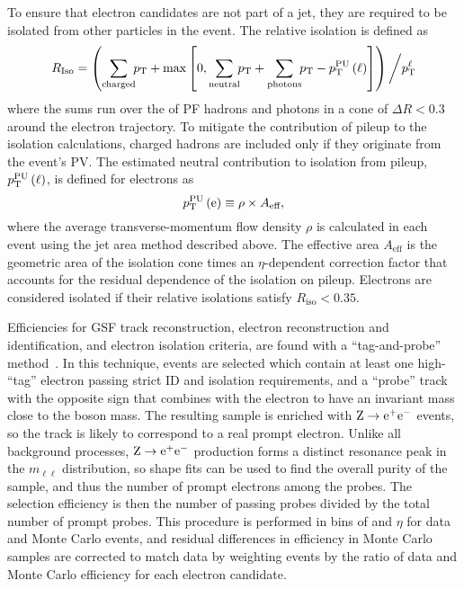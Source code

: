 To ensure that electron candidates are not part of a jet, they are required to be isolated from other particles in the event.
The relative isolation is defined as
\begin{equation}\label{eq:iso}
  R_\text{Iso} = \left( \sum_\text{charged} \! \!p_\mathrm{T} + \max\left[0, \sum_\text{neutral} \! \!p_\mathrm{T} + \sum_{\text{photons}} \! \!p_\mathrm{T} - p_\mathrm{T}^\text{PU} \left(\ell\right) \right]\right) \bigg/ p_\mathrm{T}^{\ell}
\end{equation}
where the sums run over the {\pt} of PF hadrons and photons in a cone of $\Delta R < 0.3$ around the electron trajectory.
To mitigate the contribution of pileup to the isolation calculations, charged hadrons are included only if they originate from the event's PV\@.
The estimated neutral contribution to isolation from pileup, $p_\mathrm{T}^\text{PU}\left(\ell\right)$, is defined for electrons as
\begin{equation}
  p_\mathrm{T}^\text{PU}\left(\mathrm{e}\right) \equiv \rho \times A_\text{eff},
\end{equation}
where the average transverse-momentum flow density $\rho$ is calculated in each event using the jet area method described above.
The effective area $A_\text{eff}$ is the geometric area of the isolation cone times an $\eta$-dependent correction factor that accounts for the residual dependence of the isolation on pileup.
Electrons are considered isolated if their relative isolations satisfy $R_\text{iso} <0.35$.

Efficiencies for GSF track reconstruction, electron reconstruction and identification, and electron isolation criteria, are found with a ``tag-and-probe'' method~\cite{CMS:2011aa}.
In this technique, events are selected which contain at least one high-{\pt} ``tag'' electron passing strict ID and isolation requirements, and a ``probe'' track with the opposite sign that combines with the electron to have an invariant mass close to the {\PZ} boson mass.
The resulting sample is enriched with $\mathrm{Z} \to \mathrm{e}^+\mathrm{e}^-$ events, so the track is likely to correspond to a real prompt electron.
Unlike all background processes, $\mathrm{Z} \to \mathrm{e}^+\mathrm{e}^-$ production forms a distinct resonance peak in the $m_{\ell\ell}$ distribution, so shape fits can be used to find the overall purity of the sample, and thus the number of prompt electrons among the probes.
The selection efficiency is then the number of passing probes divided by the total number of prompt probes.
This procedure is performed in bins of {\pt} and $\eta$ for data and Monte Carlo events, and residual differences in efficiency in Monte Carlo samples are corrected to match data by weighting events by the ratio of data and Monte Carlo efficiency for each electron candidate.


